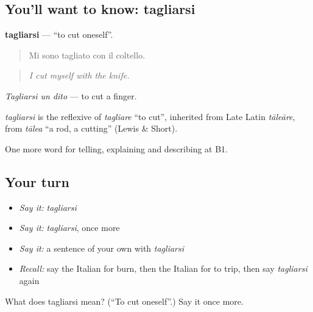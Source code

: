 \subsection*{You'll want to know: tagliarsi}
\textbf{tagliarsi} — \textquotedblleft{}to cut oneself\textquotedblright{}.

\begin{quote}
Mi sono tagliato con il coltello.
\end{quote}

\begin{quote}
\emph{I cut myself with the knife.}
\end{quote}

\emph{Tagliarsi un dito} — to cut a finger.

\begin{cousinweb}
\emph{tagliarsi} is the reflexive of \emph{tagliare} \textquotedblleft{}to cut\textquotedblright{}, inherited from Late Latin \emph{tāleāre}, from \emph{tālea} \textquotedblleft{}a rod, a cutting\textquotedblright{} (Lewis \& Short).
\end{cousinweb}

\begin{grammarlens}[title={What you've built}]
One more word for telling, explaining and describing at B1.
\end{grammarlens}

\subsection*{Your turn}
\begin{itemize}
\raggedright
  \item \emph{Say it:} \emph{tagliarsi}
  \item \emph{Say it:} \emph{tagliarsi}, once more
  \item \emph{Say it:} a sentence of your own with \emph{tagliarsi}
  \item \emph{Recall:} say the Italian for burn, then the Italian for to trip, then say \emph{tagliarsi} again
\end{itemize}

\begin{tcolorbox}[breakable,colback=teal!4,colframe=teal!35!black,title={Before you move on}]
What does tagliarsi mean? (\textquotedblleft{}To cut oneself\textquotedblright{}.) Say it once more.
\end{tcolorbox}
